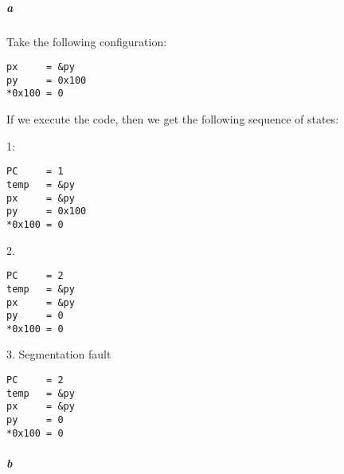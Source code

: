 \documentclass{article}
\begin{document}
\subparagraph{a}

Take the following configuration:

\begin{verbatim}
px     = &py
py     = 0x100
*0x100 = 0
\end{verbatim}

If we execute the code, then we get the following sequence of states:

1:
\begin{verbatim}
PC	   = 1
temp   = &py
px     = &py
py     = 0x100
*0x100 = 0
\end{verbatim}

2.
\begin{verbatim}
PC	   = 2
temp   = &py
px     = &py
py     = 0
*0x100 = 0
\end{verbatim}

3. Segmentation fault
\begin{verbatim}
PC	   = 2
temp   = &py
px     = &py
py     = 0
*0x100 = 0
\end{verbatim}


\subparagraph{b}
\end{document}
